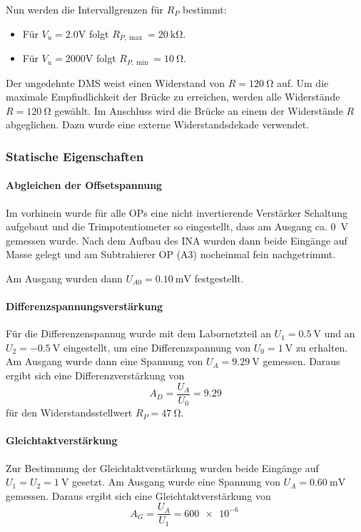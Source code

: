 Nun werden die Intervallgrenzen für $R_P$ bestimmt:
\begin{itemize}[noitemsep]
	\item Für $V_u = 2.0\si{\volt}$ folgt $R_{P,\max} = \SI{20}{\kilo\ohm}$.
	\item Für $V_u = 2000\si{\volt}$ folgt $R_{P,\min} = \SI{10}{\ohm}$.
\end{itemize}

Der ungedehnte DMS weist einen Widerstand von $R=\SI{120}{\ohm}$ auf. Um die maximale Empfindlichkeit der Brücke zu erreichen, werden alle Widerstände $R=\SI{120}{\ohm}$ gewählt. Im Anschluss wird die Brücke an einem der Widerstände $R$ abgeglichen. Dazu wurde eine externe Widerstandsdekade verwendet.

\subsubsection{Statische Eigenschaften}

\paragraph{Abgleichen der Offsetspannung} Im vorhinein wurde für alle OPs eine nicht invertierende Verstärker Schaltung aufgebaut und die Trimpotentiometer so eingestellt, dass am Ausgang ca. \SI{0}{\volt} gemessen wurde. Nach dem Aufbau des INA wurden dann beide Eingänge auf Masse gelegt und am Subtrahierer OP (A3) nocheinmal fein nachgetrimmt.

Am Ausgang wurden dann $U_{A0} = \SI{0.10}{\milli\volt}$ festgestellt. 

\paragraph{Differenzspannungsverstärkung} Für die Differenzenspannug wurde mit dem Labornetzteil an $U_1=\SI{0.5}{\volt}$ und an $U_2=\SI{-0.5}{\volt}$ eingestellt, um eine Differenzspannung von $U_{0}=\SI{1}{\volt}$ zu erhalten. Am Ausgang wurde dann eine Spannung von $U_A = \SI{9.29}{\volt}$ gemessen. Daraus ergibt sich eine Differenzverstärkung von
\[A_D=\frac{U_A}{U_0} = 9.29\]
für den Widerstandsstellwert $R_P = \SI{47}{\ohm}$.

\paragraph{Gleichtaktverstärkung} Zur Bestimmung der Gleichtaktverstärkung wurden beide Eingänge auf $U_1 = U_2 = \SI{1}{\volt}$ gesetzt. Am Ausgang wurde eine Spannung von $U_A = \SI{0.60}{\milli\volt}$ gemessen. Daraus ergibt sich eine Gleichtaktverstärkung von
\[A_G = \frac{U_A}{U_1} = \SI{600e-6}{}\]

